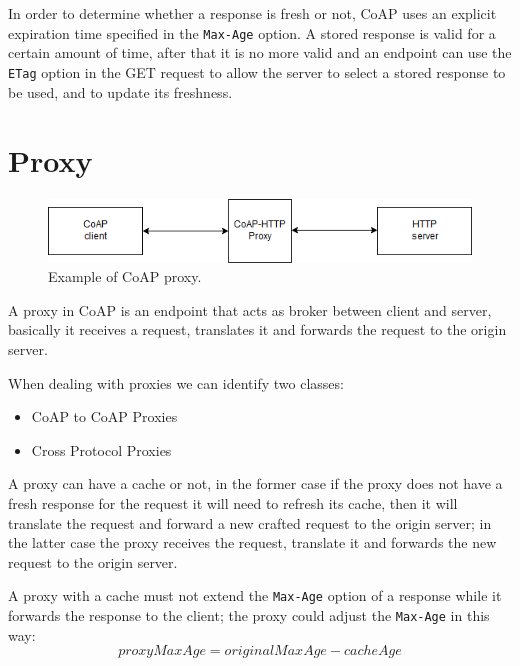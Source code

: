 	In order to determine whether a response is fresh or not, CoAP uses an explicit expiration time specified in the \texttt{Max-Age} option.\newline
	A stored response is valid for a certain amount of time, after that it is no more valid and an endpoint can use the \texttt{ETag} option in the GET request to allow the server to select a stored response to be used, and to update its freshness.\newline
	
	\section{Proxy}\label{sc:proxy}
	
	\begin{figure}
		\includegraphics[width=\linewidth]{coap-img1.png}
		\caption{Example of CoAP proxy.}
		\label{fig:coap1}
	\end{figure}

	A proxy in CoAP is an endpoint that acts as broker between client and server, basically it receives a request, translates it and forwards the request to the origin server.
	
	When dealing with proxies we can identify two classes:
	\begin{itemize}
		\item CoAP to CoAP Proxies
		\item Cross Protocol Proxies
	\end{itemize}
	
	A proxy can have a cache or not, in the former case if the proxy does not have a fresh response for the request it will need to refresh its cache, then it will translate the request and forward a new crafted request to the origin server; in the latter case the proxy receives the request, translate it and forwards the new request to the origin server.
	
	A proxy with a cache must not extend the \texttt{Max-Age} option of a response while it forwards the response to the client; the proxy could adjust the \texttt{Max-Age} in this way:
	\begin{equation}
		proxyMaxAge=originalMaxAge-cacheAge
	\end{equation}
	
